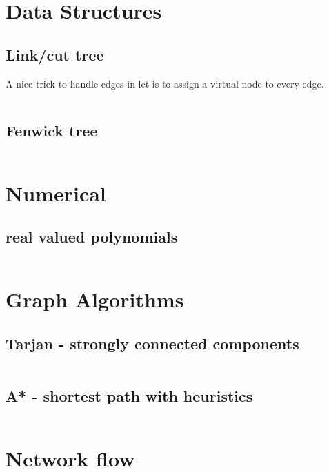 \documentclass[portrait, 8pt, a4paper, oneside, landscape]{extarticle}
\begin{document}
\thispagestyle{empty}
\begin{figure}[h!]

\end{figure}
\newpage

\twocolumn
\maketitlepage
\newpage

\section{Data Structures}
\subsection{Link/cut tree}
A nice trick to handle edges in lct is to assign a virtual node to every edge.
\inputminted{cpp}{src/lct.cpp}
\subsection{Fenwick tree}
\inputminted{cpp}{src/fenwick2d.cpp}

\section{Numerical}

\subsection{real valued polynomials}
\inputminted{cpp}{src/poly.cpp}

\section{Graph Algorithms}

\subsection{Tarjan - strongly connected components}
\inputminted{cpp}{src/scc.cpp}

\subsection{A* - shortest path with heuristics}
\inputminted{rust}{src/a_star.rs}

\section{Network flow}
\end{document}
